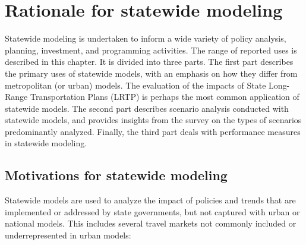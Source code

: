 \chapter{Rationale for statewide modeling}\label{sec:rationale-for-statewide-modeling}

Statewide modeling is undertaken to inform a wide variety of policy analysis, planning, investment, and programming activities. The range of reported uses is described in this chapter. It is divided into three parts. The first part describes the primary uses of statewide models, with an emphasis on how they differ from metropolitan (or urban) models. The evaluation of the impacts of State Long-Range Transportation Plans (LRTP) is perhaps the most common application of statewide models. The second part describes scenario analysis conducted with statewide models, and provides insights from the survey on the types of scenarios predominantly analyzed. Finally, the third part deals with performance measures in statewide modeling.

\section{Motivations for statewide modeling}

Statewide models are used to analyze the impact of policies and trends that are implemented or addressed by state governments, but not captured with urban or national models. This includes several travel markets not commonly included or underrepresented in urban models:

